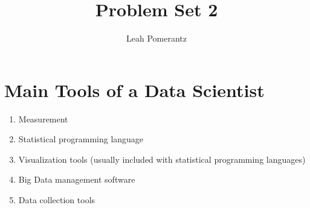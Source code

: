 \documentclass{article}
\title{Problem Set 2}
\author{Leah Pomerantz}
\begin{document}
\maketitle


\section{Main Tools of a Data Scientist}

\begin{enumerate}
  \item Measurement
  \item Statistical programming language
  \item Visualization tools (usually included with statistical programming languages)
  \item Big Data management software
  \item Data collection tools
\end{enumerate}
\end{document}
